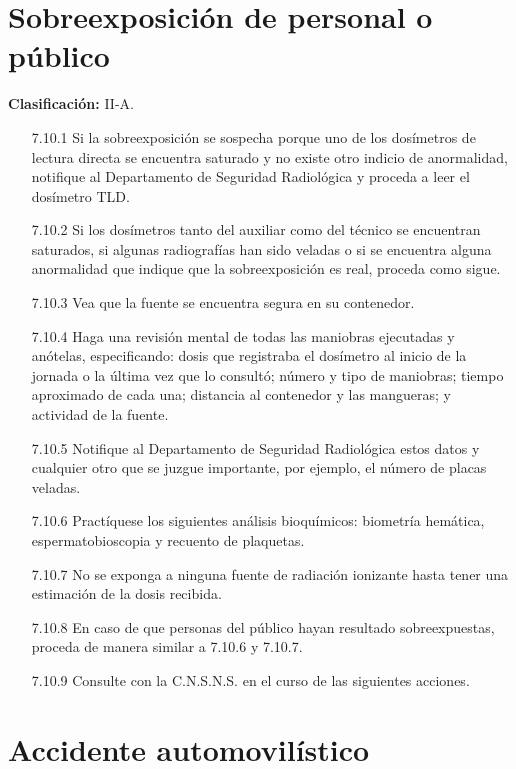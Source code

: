 \section{Sobreexposición de personal o público}

\textbf{Clasificación:} II-A.
\begin{enumerate}
  \item[7.10.1] Si la sobreexposición se sospecha porque uno de los dosímetros de lectura directa se encuentra saturado y no existe otro indicio de anormalidad, notifique al Departamento de Seguridad Radiológica y proceda a leer el dosímetro TLD.
  \item[7.10.2] Si los dosímetros tanto del auxiliar como del técnico se encuentran saturados, si algunas radiografías han sido veladas o si se encuentra alguna anormalidad que indique que la sobreexposición es real, proceda como sigue.
  \item[7.10.3] Vea que la fuente se encuentra segura en su contenedor.
  \item[7.10.4] Haga una revisión mental de todas las maniobras ejecutadas y anótelas, especificando: dosis que registraba el dosímetro al inicio de la jornada o la última vez que lo consultó; número y tipo de maniobras; tiempo aproximado de cada una; distancia al contenedor y las mangueras; y actividad de la fuente.
  \item[7.10.5] Notifique al Departamento de Seguridad Radiológica estos datos y cualquier otro que se juzgue importante, por ejemplo, el número de placas veladas.
  \item[7.10.6] Practíquese los siguientes análisis bioquímicos: biometría hemática, espermatobioscopia y recuento de plaquetas.
  \item[7.10.7] No se exponga a ninguna fuente de radiación ionizante hasta tener una estimación de la dosis recibida.
  \item[7.10.8] En caso de que personas del público hayan resultado sobreexpuestas, proceda de manera similar a 7.10.6 y 7.10.7.
  \item[7.10.9] Consulte con la C.N.S.N.S. en el curso de las siguientes acciones.
\end{enumerate}

\section{Accidente automovilístico}


